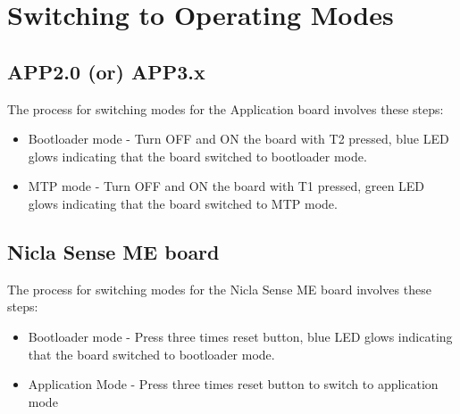 \documentclass{article}
\begin{document}
\section{Switching to Operating Modes}\label{SwitchModes}

\subsection{APP2.0 (or) APP3.x}
The process for switching modes for the Application board involves these steps:
\begin{itemize}
	\item Bootloader mode - Turn OFF and ON the board with T2 pressed, blue LED glows indicating that the board switched to bootloader mode.
	\item MTP mode - Turn OFF and ON the board with T1 pressed, green LED glows indicating that the board switched to MTP mode.
\end{itemize}

\subsection{Nicla Sense ME board}
The process for switching modes for the Nicla Sense ME board involves these steps:
\begin{itemize}
	\item Bootloader mode - Press three times reset button, blue LED glows indicating that the board switched to bootloader mode.
	\item Application Mode - Press three times reset button to switch to application mode
\end{itemize}
\end{document}

